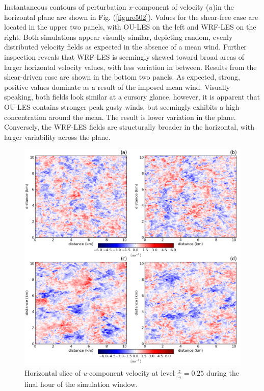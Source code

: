 Instantaneous contours of perturbation $x$-component of velocity ($u$)in the horizontal plane are shown in Fig. (\autoref{figure502}). Values for the shear-free case are located in the upper two panels, with OU-LES on the left and WRF-LES on the right. Both simulations appear visually similar, depicting random, evenly distributed velocity fields as expected in the absence of a mean wind. Further inspection reveals that WRF-LES is seemingly skewed toward broad areas of larger horizontal velocity values, with less variation in between. Results from the shear-driven case are shown in the bottom two panels. As expected, strong, positive values dominate as a result of the imposed mean wind. Visually speaking, both fields look similar at a cursory glance, however, it is apparent that OU-LES contains stronger peak gusty winds, but seemingly exhibits a high concentration around the mean. The result is lower variation in the plane. Conversely, the WRF-LES fields are structurally broader in the horizontal, with larger variability across the plane.


\begin{figure}[!ht]
\begin{center}
\includegraphics[width=\textwidth]{figures/chapter5/u_slice}
\end{center}
\caption{Horizontal slice of \textit{u}-component velocity at level $\frac{z}{z_i} = 0.25$ during the final hour of the simulation window.}
\label{figure502}
\end{figure}


